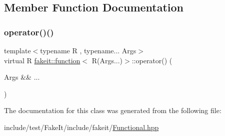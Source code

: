 \subsection{Member Function Documentation}
\mbox{\label{classfakeit_1_1function_3_01R_07Args_8_8_8_08_4_ab6d82373650cb3eb6fa03fcdecfd8d13}} 
\subsubsection{\texorpdfstring{operator()()}{operator()()}}
{\footnotesize\ttfamily template$<$typename R , typename... Args$>$ \\
virtual R \mbox{\hyperlink{classfakeit_1_1function}{fakeit\+::function}}$<$ R(Args...)$>$\+::operator() (\begin{DoxyParamCaption}\item[{Args \&\&}]{... }\end{DoxyParamCaption})\hspace{0.3cm}{\ttfamily [pure virtual]}}



The documentation for this class was generated from the following file\+:\begin{DoxyCompactItemize}
\item 
include/test/\+Fake\+It/include/fakeit/\mbox{\hyperlink{Functional_8hpp}{Functional.\+hpp}}\end{DoxyCompactItemize}
